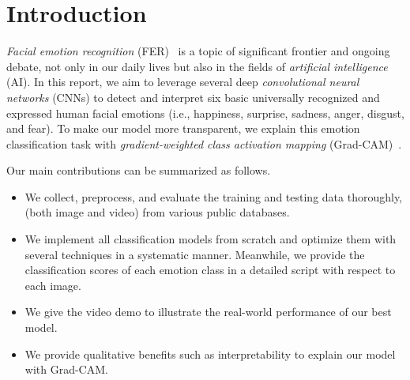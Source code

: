 \section{Introduction}
\label{sec:intro}

\textit{Facial emotion recognition} (FER)~\cite{Ko18,JainSS19,YinTLS019,Malik0R21} is a topic of significant frontier and ongoing debate, 
not only in our daily lives but also in the fields of \textit{artificial intelligence} (AI).
In this report, we aim to leverage several deep 
\textit{convolutional neural networks} (CNNs) to detect and interpret six basic universally recognized and expressed human facial emotions 
(i.e., happiness, surprise, sadness, anger, disgust, and fear). 
To make our model more transparent, 
we explain this emotion classification task with \textit{gradient-weighted class activation mapping} 
(Grad-CAM)~\cite{SelvarajuCDVPB17}. 

Our main contributions can be summarized as follows.
\begin{itemize}
  \item We collect, preprocess, and evaluate the training and testing data thoroughly, 
  (both image and video) from various public databases. 
  \item We implement all classification models from scratch and optimize them with several techniques in a systematic manner. 
  Meanwhile, we provide the classification scores of each emotion class in a detailed script with respect to each image. 
  \item We give the video demo to illustrate the real-world performance of our best model.
  \item We provide qualitative benefits such as interpretability to explain our model with Grad-CAM. 
\end{itemize}

